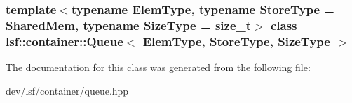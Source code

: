 \subsubsection*{template$<$typename ElemType, typename StoreType = SharedMem, typename SizeType = size\_\-t$>$ class lsf::container::Queue$<$ ElemType, StoreType, SizeType $>$}



The documentation for this class was generated from the following file:\begin{DoxyCompactItemize}
\item 
dev/lsf/container/queue.hpp\end{DoxyCompactItemize}
